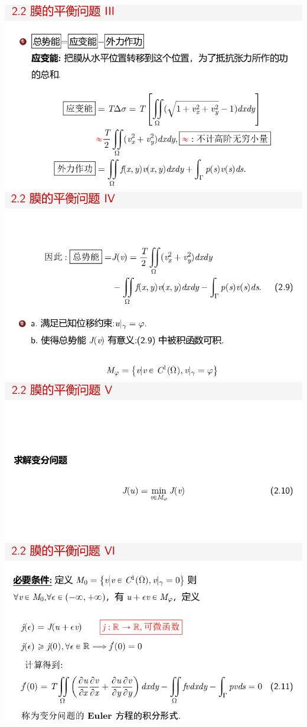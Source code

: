 \documentclass[11pt,a4paper]{ctexart}
\begin{document}
\begin{paracol}{2}
\newpage
\includegraphics[width=\linewidth]{chap01_60.png}
\includegraphics[width=\linewidth]{chap01_61.png}
\includegraphics[width=\linewidth]{chap01_62.png}
\newpage
\includegraphics[width=\linewidth]{chap01_63.png}

\end{paracol}
\end{document}

